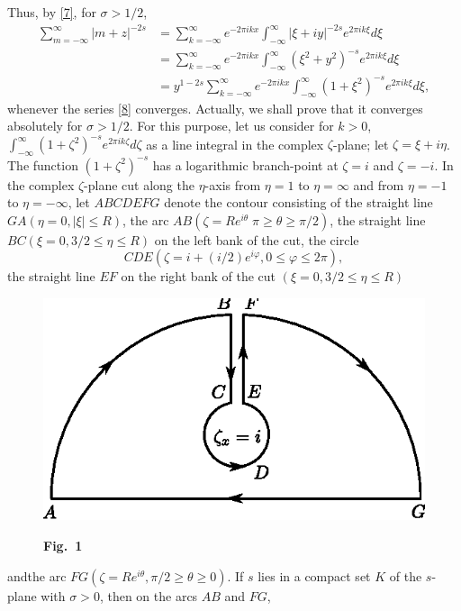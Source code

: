 Thus, by \eqref{7}, for $\sigma>1/2$,
\begin{align*}
\sum^{\infty}_{m=-\infty}|m+z|^{-2s} &=
\sum^{\infty}_{k=-\infty}e^{-2\pi
  ikx}\int^{\infty}_{-\infty}|\xi+iy|^{-2s}e^{2\pi ik\xi}d\xi\\
&= \sum^{\infty}_{k=-\infty}e^{-2\pi
  ikx}\int^{\infty}_{-\infty}(\xi^{2}+y^{2})^{-s}e^{2\pi ik\xi}d\xi\\
&= y^{1-2s}\sum^{\infty}_{k=-\infty}e^{-2\pi
  ikx}\int^{\infty}_{-\infty}(1+\xi^{2})^{-s}e^{2\pi ik\xi}d\xi,\tag{8}\label{8}
\end{align*}
whenever the series \eqref{8} converges. Actually, we shall prove that
it converges absolutely for $\sigma>1/2$. For this purpose, let us
consider for $k>0$, $\int^{\infty}_{-\infty}(1+\zeta^{2})^{-s}e^{2\pi
  ik\zeta}d\zeta$ as a line integral in the complex $\zeta$-plane; let
$\zeta=\xi+i\eta$. The function $(1+\zeta^{2})^{-s}$ has a logarithmic
branch-point at $\zeta=i$ and $\zeta=-i$. In the complex $\zeta$-plane
cut along the $\eta$-axis from $\eta=1$ to $\eta=\infty$ and from
$\eta=-1$ to $\eta=-\infty$, let $ABCDEFG$ denote the contour
consisting of the straight line $GA(\eta=0,|\xi|\leq R)$, the arc
$AB(\zeta=R e^{i\theta} \; \pi\geq \theta\geq \pi/2)$, the straight line
$BC(\xi=0, 3/2\leq \eta\leq R)$ on the left bank of the cut, the
circle
$$
CDE(\zeta=i+(i/2)e^{i\varphi}, 0\leq \varphi\leq 2\pi),
$$
the straight line $EF$ on the right bank of the cut $(\xi=0,3/2\leq
\eta\leq R)$ 
\begin{figure}[H]
\centering
\includegraphics{fig1.eps}

\medskip
\centerline{\bf Fig.~1}
\end{figure}
and\pageoriginale the arc $FG(\zeta=R e^{i\theta},\pi/2\geq \theta\geq
0)$. If $s$ lies in a compact set $K$ of the $s$-plane with
$\sigma>0$, then on the arcs $AB$ and $FG$,
